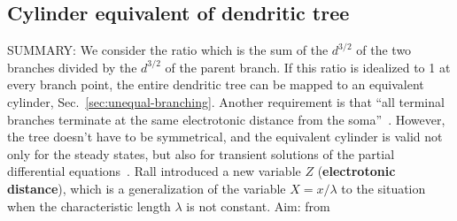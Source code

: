 




\subsection{Cylinder equivalent of dendritic tree}
\label{sec:cylind-equiv-dendr}

SUMMARY: We consider the ratio which is the sum of the $d^{3/2}$ of
the two branches divided by the $d^{3/2}$ of the parent branch. If
this ratio is idealized to 1 at every branch point, the entire
dendritic tree can be mapped to an equivalent cylinder,
Sec.~\ref{sec:unequal-branching}. Another requirement is that ``all
terminal branches terminate at the same electrotonic distance from the
soma''~\cite{rall2006bio}. However, the tree doesn't have to be
symmetrical, and the equivalent cylinder is valid not only for the
steady states, but also for transient solutions of the partial
differential equations~\cite{rall1962tpp}.  Rall introduced a new
variable $Z$ ({\bf electrotonic distance}), which is a generalization
of the variable $X=x/\lambda$ to the situation when the characteristic
length $\lambda$ is not constant. Aim: from

